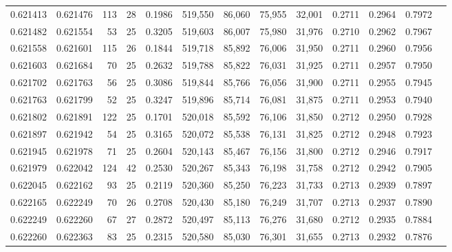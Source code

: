 \begin{tabular}{rrrrrrrrrrrrr}
0.621413 & 0.621476 & 113 &  28 &                                     0.1986 & 519,550 &  86,060 &  75,955 &  32,001 & 0.2711 & 0.2964 & 0.7972 \\
0.621482 & 0.621554 &  53 &  25 &                                     0.3205 & 519,603 &  86,007 &  75,980 &  31,976 & 0.2710 & 0.2962 & 0.7967 \\
0.621558 & 0.621601 & 115 &  26 &                                     0.1844 & 519,718 &  85,892 &  76,006 &  31,950 & 0.2711 & 0.2960 & 0.7956 \\
0.621603 & 0.621684 &  70 &  25 &                                     0.2632 & 519,788 &  85,822 &  76,031 &  31,925 & 0.2711 & 0.2957 & 0.7950 \\
0.621702 & 0.621763 &  56 &  25 &                                     0.3086 & 519,844 &  85,766 &  76,056 &  31,900 & 0.2711 & 0.2955 & 0.7945 \\
0.621763 & 0.621799 &  52 &  25 &                                     0.3247 & 519,896 &  85,714 &  76,081 &  31,875 & 0.2711 & 0.2953 & 0.7940 \\
0.621802 & 0.621891 & 122 &  25 &                                     0.1701 & 520,018 &  85,592 &  76,106 &  31,850 & 0.2712 & 0.2950 & 0.7928 \\
0.621897 & 0.621942 &  54 &  25 &                                     0.3165 & 520,072 &  85,538 &  76,131 &  31,825 & 0.2712 & 0.2948 & 0.7923 \\
0.621945 & 0.621978 &  71 &  25 &                                     0.2604 & 520,143 &  85,467 &  76,156 &  31,800 & 0.2712 & 0.2946 & 0.7917 \\
0.621979 & 0.622042 & 124 &  42 &                                     0.2530 & 520,267 &  85,343 &  76,198 &  31,758 & 0.2712 & 0.2942 & 0.7905 \\
0.622045 & 0.622162 &  93 &  25 &                                     0.2119 & 520,360 &  85,250 &  76,223 &  31,733 & 0.2713 & 0.2939 & 0.7897 \\
0.622165 & 0.622249 &  70 &  26 &                                     0.2708 & 520,430 &  85,180 &  76,249 &  31,707 & 0.2713 & 0.2937 & 0.7890 \\
0.622249 & 0.622260 &  67 &  27 &                                     0.2872 & 520,497 &  85,113 &  76,276 &  31,680 & 0.2712 & 0.2935 & 0.7884 \\
0.622260 & 0.622363 &  83 &  25 &                                     0.2315 & 520,580 &  85,030 &  76,301 &  31,655 & 0.2713 & 0.2932 & 0.7876 \\

\end{tabular}
